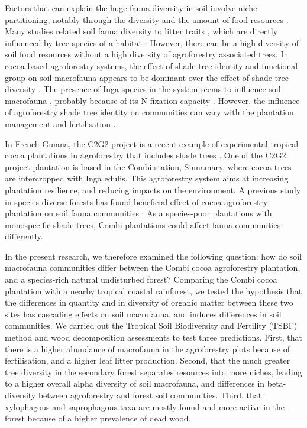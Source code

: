 \documentclass[fleqn,10pt]{ArtEcoFoG} %
\begin{document}
Factors that can explain the huge fauna diversity in soil involve niche partitioning, notably through the diversity and the amount of food resources \citep{Anderson1975, potapov_feeding_2022}. Many studies related soil fauna diversity to litter traits \citep{moco_relationships_2010, laossi_effects_2008}, which are directly influenced by tree species of a habitat \citep{korboulewsky_how_2016, rousseau_shade_2021}. However, there can be a high diversity of soil food resources without a high diversity of agroforestry associated trees. In cocoa-based agroforestry systems, the effect of shade tree identity and functional group on soil macrofauna appears to be dominant over the effect of shade tree diversity \citep{laossi_effects_2008, rousseau_shade_2021, wardle_influence_2006}. The presence of Inga species in the system seems to influence soil macrofauna \citep{rousseau_shade_2021}, probably because of its N-fixation capacity \citep{blanchart_long-term_2006, kaspari_biogeochemistry_2009, rousseau_shade_2021, velasquez_soil_2012}. However, the influence of agroforestry shade tree identity on communities can vary with the plantation management and fertilisation \citep{sauvadet_shade_2019}.

In French Guiana, the C2G2 project is a recent example of experimental tropical cocoa plantations in agroforestry that includes shade trees \citep{saj_projetc2g2_2023}. One of the C2G2 project plantation is based in the Combi station, Sinnamary, where cocoa trees are intercropped with Inga edulis. This agroforestry system aims at increasing plantation resilience, and reducing impacts on the environment. A previous study in species diverse forests has found beneficial effect of cocoa agroforestry plantation on soil fauna communities \citep{da_silva_moco_soil_2009}. As a species-poor plantations with monospecific shade trees, Combi plantations could affect fauna communities differently.

In the present research, we therefore examined the following question: how do soil macrofauna communities differ between the Combi cocoa agroforestry plantation, and a species-rich natural undisturbed forest? Comparing the Combi cocoa plantation with a nearby tropical coastal rainforest, we tested the hypothesis that the differences in quantity and in diversity of organic matter between these two sites has cascading effects on soil macrofauna, and induces differences in soil communities. We carried out the Tropical Soil Biodiversity and Fertility (TSBF) method and wood decomposition assessments to test three predictions. First, that there is a higher abundance of macrofauna in the agroforestry plots because of fertilisation, and a higher leaf litter production. Second, that the much greater tree diversity in the secondary forest separates resources into more niches, leading to a higher overall alpha diversity of soil macrofauna, and differences in beta-diversity between agroforestry and forest soil communities. Third, that xylophagous and saprophagous taxa are mostly found and more active in the forest because of a higher prevalence of dead wood.
\end{document}
